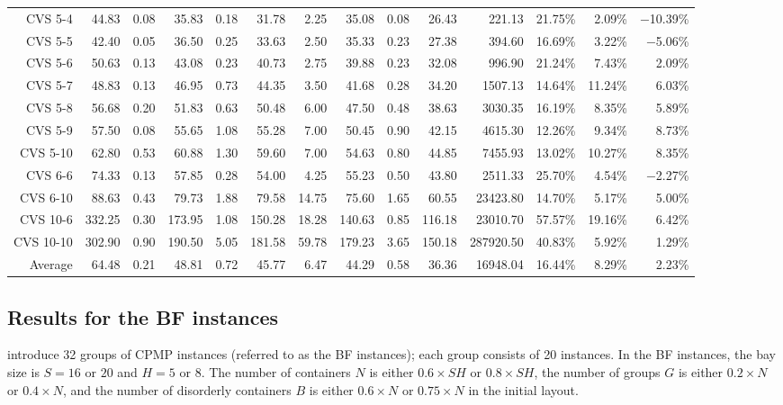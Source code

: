 \documentclass[review,3p,times,12pt,number]{elsarticle}\usepackage{amsmath}\usepackage{amssymb}
\renewcommand{\citet}[1]{\citeauthor{#1} \citep{#1}}
\begin{document}
\begin{landscape}
\begin{table}[htbp]
\begin{tabular}{rrrrrrrrrrrrrr}
CVS 5-4   & 44.83  & 0.08 & 35.83  & 0.18 & 31.78  & 2.25 & 35.08  & 0.08  & 26.43 & 221.13  &  21.75\%  & 2.09\%   & $-$10.39\%\\
CVS 5-5   & 42.40  & 0.05 & 36.50  & 0.25 & 33.63  & 2.50 & 35.33  & 0.23  & 27.38 & 394.60  &  16.69\%  & 3.22\%   & $-$5.06\%\\
CVS 5-6   & 50.63  & 0.13 & 43.08  & 0.23 & 40.73  & 2.75 & 39.88  & 0.23  & 32.08 & 996.90  & 21.24\%  & 7.43\%   & 2.09\% \\
CVS 5-7   & 48.83  & 0.13 & 46.95  & 0.73 & 44.35  & 3.50 & 41.68  & 0.28  & 34.20 & 1507.13 &  14.64\%  & 11.24\%  & 6.03\%\\
CVS 5-8   & 56.68  & 0.20 & 51.83  & 0.63 & 50.48  & 6.00 & 47.50  & 0.48  & 38.63 & 3030.35 &  16.19\%  & 8.35\%   & 5.89\%\\
CVS 5-9   & 57.50  & 0.08 & 55.65  & 1.08 & 55.28  & 7.00 & 50.45  & 0.90  & 42.15 & 4615.30 &  12.26\%  & 9.34\%   & 8.73\%\\
CVS 5-10  & 62.80  & 0.53 & 60.88  & 1.30 & 59.60  & 7.00 & 54.63  & 0.80  & 44.85 & 7455.93 & 13.02\%  & 10.27\%  & 8.35\%\\
CVS 6-6   & 74.33  & 0.13 & 57.85  & 0.28 & 54.00  & 4.25 & 55.23  & 0.50  & 43.80 & 2511.33 &  25.70\%   & 4.54\%   & $-$2.27\%\\
CVS 6-10  & 88.63  & 0.43 & 79.73  & 1.88 & 79.58  & 14.75& 75.60  & 1.65  & 60.55 & 23423.80 & 14.70\%   & 5.17\%   & 5.00\%\\
CVS 10-6  & 332.25 & 0.30 & 173.95 & 1.08 & 150.28 & 18.28& 140.63 & 0.85 & 116.18 & 23010.70 &  57.57\%  & 19.16\%  & 6.42\%\\
CVS 10-10 & 302.90 & 0.90 & 190.50 & 5.05 & 181.58 & 59.78&179.23  & 3.65  & 150.18 & 287920.50 &  40.83\%  & 5.92\%   & 1.29\%\\[\defaultaddspace]
Average   & 64.48  & 0.21 & 48.81  & 0.72 & 45.77  & 6.47 &44.29  & 0.58  & 36.36 & 16948.04 &  16.44\%  & 8.29\%   & 2.23\%\\
\bottomrule
\end{tabular}
\end{table}
\end{landscape}

\subsection{Results for the BF instances}

\citet{bort2012} introduce 32 groups of CPMP instances (referred to as the BF instances); each group consists of 20 instances. In the BF instances, the bay size is $S=16$ or $20$ and $H=5$ or $8$. The number of containers $N$ is either $0.6\times SH$ or $0.8\times SH$, the number of groups $G$ is either $0.2\times N$ or $0.4\times N$, and the number of disorderly containers $B$ is either $0.6\times N$ or $0.75\times N$ in the initial layout.
\end{document}
